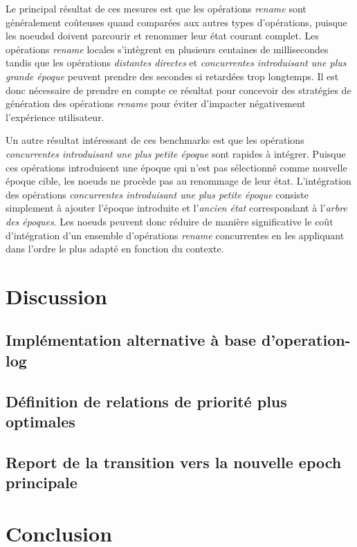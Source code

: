\documentclass[12pt]{thesul}
\begin{document}
Le principal résultat de ces mesures est que les opérations \emph{rename} sont généralement coûteuses quand comparées aux autres types d'opérations, puisque les noeudsd doivent parcourir et renommer leur état courant complet.
Les opérations \emph{rename} locales s'intègrent en plusieurs centaines de millisecondes tandis que les opérations \emph{distantes directes} et \emph{concurrentes introduisant une plus grande époque} peuvent prendre des secondes si retardées trop longtemps.
Il est donc nécessaire de prendre en compte ce résultat pour concevoir des stratégies de génération des opérations \emph{rename} pour éviter d'impacter négativement l'expérience utilisateur.

Un autre résultat intéressant de ces benchmarks est que les opérations \emph{concurrentes introduisant une plus petite époque} sont rapides à intégrer.
Puisque ces opérations introduisent une époque qui n'est pas sélectionné comme nouvelle époque cible, les noeuds ne procède pas au renommage de leur état.
L'intégration des opérations \emph{concurrentes introduisant une plus petite époque} consiste simplement à ajouter l'époque introduite et l'\emph{ancien état} correspondant à l'\emph{arbre des époques}.
Les noeuds peuvent donc réduire de manière significative le coût d'intégration d'un ensemble d'opérations \emph{rename} concurrentes en les appliquant dans l'ordre le plus adapté en fonction du contexte.

\section{Discussion}
\subsection{Implémentation alternative à base d'operation-log}
\subsection{Définition de relations de priorité plus optimales}
\subsection{Report de la transition vers la nouvelle epoch principale}
\section{Conclusion}
% 

\NumberThisInToc
\end{document}
